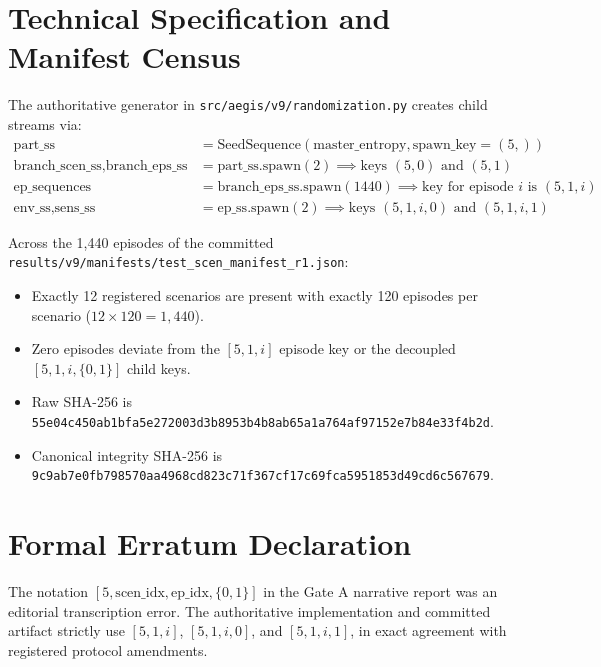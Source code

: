 \documentclass[10pt,a4paper]{article}
\begin{document}
\section{Technical Specification and Manifest Census}

The authoritative generator in \texttt{src/aegis/v9/randomization.py} creates child streams via:
\begin{align*}
    \text{part\_ss} &= \text{SeedSequence}(\text{master\_entropy}, \text{spawn\_key}=(5,)) \\
    \text{branch\_scen\_ss}, \text{branch\_eps\_ss} &= \text{part\_ss.spawn}(2) \implies \text{keys } (5, 0) \text{ and } (5, 1) \\
    \text{ep\_sequences} &= \text{branch\_eps\_ss.spawn}(1440) \implies \text{key for episode } i \text{ is } (5, 1, i) \\
    \text{env\_ss}, \text{sens\_ss} &= \text{ep\_ss.spawn}(2) \implies \text{keys } (5, 1, i, 0) \text{ and } (5, 1, i, 1)
\end{align*}

Across the 1,440 episodes of the committed \texttt{results/v9/manifests/test\_scen\_manifest\_r1.json}:
\begin{itemize}
    \item Exactly 12 registered scenarios are present with exactly 120 episodes per scenario ($12 \times 120 = 1,440$).
    \item Zero episodes deviate from the $[5, 1, i]$ episode key or the decoupled $[5, 1, i, \{0, 1\}]$ child keys.
    \item Raw SHA-256 is \texttt{55e04c450ab1bfa5e272003d3b8953b4b8ab65a1a764af97152e7b84e33f4b2d}.
    \item Canonical integrity SHA-256 is \texttt{9c9ab7e0fb798570aa4968cd823c71f367cf17c69fca5951853d49cd6c567679}.
\end{itemize}

\section{Formal Erratum Declaration}

The notation $[5, \text{scen\_idx}, \text{ep\_idx}, \{0, 1\}]$ in the Gate A narrative report was an editorial transcription error. The authoritative implementation and committed artifact strictly use $[5, 1, i]$, $[5, 1, i, 0]$, and $[5, 1, i, 1]$, in exact agreement with registered protocol amendments.
\end{document}
